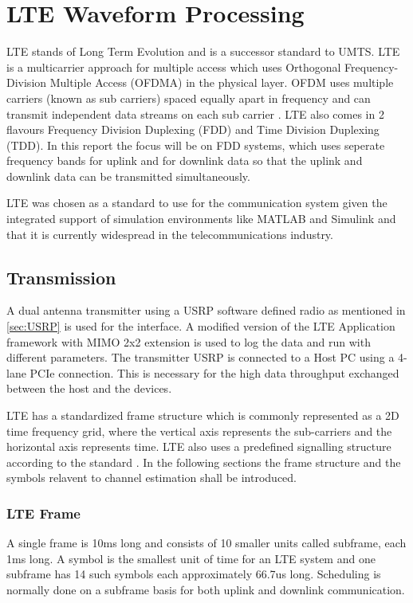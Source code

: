 \section{LTE Waveform Processing}\label{sec:LTE Waveform Processing}
LTE stands of Long Term Evolution and is a successor standard to UMTS. LTE is a multicarrier approach for multiple access which uses Orthogonal Frequency-Division Multiple Access (OFDMA) in the physical layer. OFDM uses multiple carriers (known as sub carriers) spaced equally apart in frequency and can transmit independent data streams on each sub carrier \cite{rohling}. LTE also comes in 2 flavours Frequency Division Duplexing (FDD) and Time Division Duplexing (TDD). In this report the focus will be on FDD systems, which uses seperate frequency bands for uplink and for downlink data so that the uplink and downlink data can be transmitted simultaneously.

LTE was chosen as a standard to use for the communication system given the integrated support of simulation environments like MATLAB and Simulink and that it is currently widespread in the telecommunications industry.

\subsection{Transmission} \label{ssec:Transmission}

A dual antenna transmitter using a USRP software defined radio as mentioned in \ref{sec:USRP} is used for the interface. A modified version of the LTE Application framework with MIMO 2x2 extension is used to log the data and run with different parameters. The transmitter USRP is connected to a Host PC using a 4-lane PCIe connection. This is necessary for the high data throughput exchanged between the host and the devices.

LTE has a standardized frame structure which is commonly represented as a 2D time frequency grid, where the vertical axis represents the sub-carriers and the horizontal axis represents time. LTE also uses a predefined signalling structure according to the standard \cite{3gpp36211}. In the following sections the frame structure and the symbols relavent to channel estimation shall be introduced.

\subsubsection{LTE Frame} \label{LTEFrame}

A single frame is 10ms long and consists of 10 smaller units called subframe, each 1ms long. A symbol is the smallest unit of time for an LTE system and one subframe has 14 such symbols each approximately 66.7us long. Scheduling is normally done on a subframe basis for both uplink and downlink communication.

